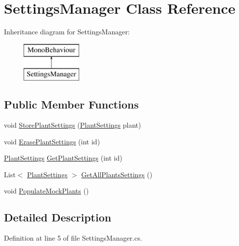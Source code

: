 \hypertarget{class_settings_manager}{}\section{Settings\+Manager Class Reference}
\label{class_settings_manager}
Inheritance diagram for Settings\+Manager\+:\begin{figure}[H]
\begin{center}
\leavevmode
\includegraphics[height=2.000000cm]{class_settings_manager}
\end{center}
\end{figure}
\subsection*{Public Member Functions}
\begin{DoxyCompactItemize}
\item 
void \mbox{\hyperlink{class_settings_manager_aeb3638844b2eee2c901a9e4bb4970697}{Store\+Plant\+Settings}} (\mbox{\hyperlink{class_plant_settings}{Plant\+Settings}} plant)
\item 
void \mbox{\hyperlink{class_settings_manager_a6e8b233eb4e8cae817131500068ea563}{Erase\+Plant\+Settings}} (int id)
\item 
\mbox{\hyperlink{class_plant_settings}{Plant\+Settings}} \mbox{\hyperlink{class_settings_manager_a5c1c1fe4e33c799018dc41ac4ebde801}{Get\+Plant\+Settings}} (int id)
\item 
List$<$ \mbox{\hyperlink{class_plant_settings}{Plant\+Settings}} $>$ \mbox{\hyperlink{class_settings_manager_a7e7845f2a734ad2114602b42e6d75e8e}{Get\+All\+Plants\+Settings}} ()
\item 
void \mbox{\hyperlink{class_settings_manager_a45c71b583356ab8c268a4c9b4b1b8f8c}{Populate\+Mock\+Plants}} ()
\end{DoxyCompactItemize}


\subsection{Detailed Description}


Definition at line 5 of file Settings\+Manager.\+cs.



